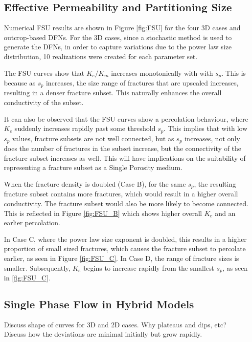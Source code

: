 \documentclass[a4paper]{article}
\begin{document}
\subsection{Effective Permeability and Partitioning Size}
Numerical FSU results are shown in Figure \ref{fig:FSU} for the four 3D cases and outcrop-based DFNs. For the 3D cases, since a stochastic method is used to generate the DFNs, in order to capture variations due to the power law size distribution, 10 realizations were created for each parameter set. 

The FSU curves show that $K_e/K_m$ increases monotonically with with $s_p$. This is because as $s_p$ increases, the size range of fractures that are upscaled increases, resulting in a denser fracture subset. This naturally enhances the overall conductivity of the subset.

It can also be observed that the FSU curves show a percolation behaviour, where $K_e$ suddenly increases rapidly past some threshold $s_p$. This implies that with low $s_p$ values, fracture subsets are not well connected, but as $s_p$ increases, not only does the number of fractures in the subset increase, but the connectivity of the fracture subset increases as well. This will have implications on the suitability of representing a fracture subset as a Single Porosity medium.

When the fracture density is doubled (Case B), for the same $s_p$, the resulting fracture subset contains more fractures, which would result in a higher overall conductivity. The fracture subset would also be more likely to become connected. This is reflected in Figure \ref{fig:FSU_B} which shows higher overall $K_e$ and an earlier percolation.

In Case C, where the power law size exponent is doubled, this results in a higher proportion of small sized fractures, which causes the fracture subset to percolate earlier, as seen in Figure \ref{fig:FSU_C}. In Case D, the range of fracture sizes is smaller. Subsequently, $K_e$ begins to increase rapidly from the smallest $s_p$, as seen in \ref{fig:FSU_C}. 



\subsection{Single Phase Flow in Hybrid Models}

Discuss shape of curves for 3D and 2D cases. Why plateaus and dips, etc? Discuss how the deviations are minimal initially but grow rapidly.
\end{document}
